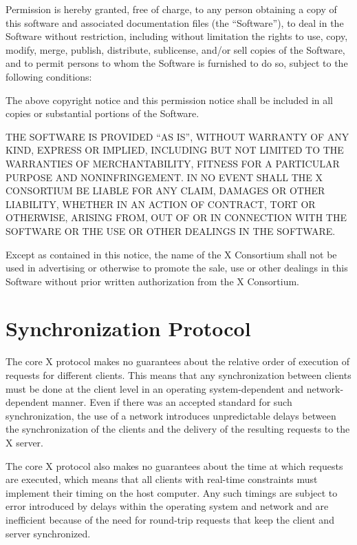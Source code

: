 {\small Permission is hereby granted, free of charge, to any person obtaining a copy
of this software and associated documentation files (the ``Software''), to deal
in the Software without restriction, including without limitation the rights
to use, copy, modify, merge, publish, distribute, sublicense, and/or sell
copies of the Software, and to permit persons to whom the Software is
furnished to do so, subject to the following conditions:

The above copyright notice and this permission notice shall be included in
all copies or substantial portions of the Software.

THE SOFTWARE IS PROVIDED ``AS IS'', WITHOUT WARRANTY OF ANY KIND, EXPRESS OR
IMPLIED, INCLUDING BUT NOT LIMITED TO THE WARRANTIES OF MERCHANTABILITY,
FITNESS FOR A PARTICULAR PURPOSE AND NONINFRINGEMENT.  IN NO EVENT SHALL THE
X CONSORTIUM BE LIABLE FOR ANY CLAIM, DAMAGES OR OTHER LIABILITY, WHETHER IN
AN ACTION OF CONTRACT, TORT OR OTHERWISE, ARISING FROM, OUT OF OR IN
CONNECTION WITH THE SOFTWARE OR THE USE OR OTHER DEALINGS IN THE SOFTWARE.

Except as contained in this notice, the name of the X Consortium shall not be
used in advertising or otherwise to promote the sale, use or other dealings
in this Software without prior written authorization from the X Consortium.}
\eject

\section{Synchronization Protocol}

The core X protocol makes no guarantees about the relative order of execution
of requests for different clients. This means that any synchronization between
clients must be done at the client level in an operating system-dependent and
network-dependent manner. Even if there was an accepted standard for such
synchronization, the use of a network introduces unpredictable delays between
the synchronization of the clients and the delivery of the resulting requests
to the X server.

The core X protocol also makes no guarantees about the time at which requests
are executed, which means that all clients with real-time constraints must
implement their timing on the host computer. Any such timings are subject to
error introduced by delays within the operating system and network and are
inefficient because of the need for round-trip requests that keep the client and
server synchronized.

